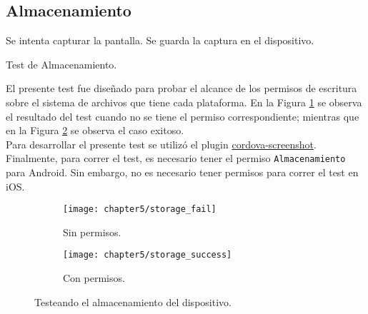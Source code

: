 \subsection{Almacenamiento}
\begin{algorithm}
	\begin{algorithmic}[1]
		\STATE Se intenta capturar la pantalla.
		\STATE Se guarda la captura en el dispositivo.
	\end{algorithmic}
	\caption{Test de Almacenamiento.}\label{alg:chap5_test_storage}
\end{algorithm}
El presente test fue diseñado para probar el alcance de los permisos de escritura sobre el sistema de archivos que tiene cada plataforma. En la Figura \ref{fig:ch05:storage_fail} se observa el resultado del test cuando no se tiene el permiso correspondiente; mientras que en la Figura \ref{fig:ch05:storage_success} se observa el caso exitoso.\\
Para desarrollar el presente test se utilizó el plugin \href{https://github.com/gitawego/cordova-screenshot}{cordova-screenshot}.\\
Finalmente, para correr el test, es necesario tener el permiso \texttt{Almacenamiento} para Android. Sin embargo, no es necesario tener permisos para correr el test en iOS.
\begin{figure}[hbtp]
   \centering
   	\begin{subfigure}{.3\linewidth}
		\texttt{[image: chapter5/storage\_fail]}
		\caption{Sin permisos.}
		\label{fig:ch05:storage_fail}
	\end{subfigure}
	\begin{subfigure}{.3\linewidth}
		\texttt{[image: chapter5/storage\_success]}
		\caption{Con permisos.}
		\label{fig:ch05:storage_success}
	\end{subfigure}
	\caption{Testeando el almacenamiento del dispositivo.}
	\label{fig:ch05:storage_test}
\end{figure}
